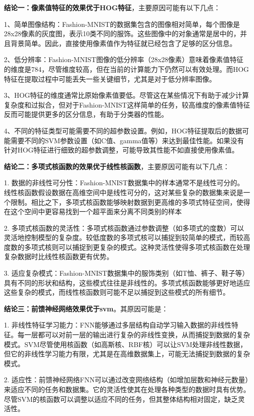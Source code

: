 \documentclass[10.5pt,compsoc,UTF8]{CjC}
\theoremstyle{mystyle}
\begin{document}
\textbf{结论一：像素值特征的效果优于HOG特征}，主要原因可能有以下几点：

1、简单图像结构：Fashion-MNIST的数据集包含的图像相对简单，每个图像是28x28像素的灰度图，表示10类不同的服饰。这些图像中的对象通常是居中的，并且背景简单。因此，直接使用像素值作为特征就已经包含了足够的区分信息。

2、低分辨率：Fashion-MNIST图像的低分辨率（28x28像素）意味着像素值特征的维度是784，尽管维度较高，但在当前的计算能力下仍然可以有效处理。而HOG特征在提取过程中可能丢失一些关键细节，尤其是对于低分辨率图像。

3、HOG特征的维度通常比原始像素值要低。尽管这在某些情况下有助于减少计算复杂度和过拟合，但对于Fashion-MNIST这样简单的任务，较高维度的像素值特征反而可能提供更多的区分信息，有助于分类器的性能。

4、不同的特征类型可能需要不同的超参数设置。例如，HOG特征提取后的数据可能需要不同的SVM参数设置（如C值、gamma值等）来达到最佳性能。如果没有针对HOG特征进行细致的超参数调整，可能导致其性能不如直接使用像素值。

\textbf{结论二：多项式核函数的效果优于线性核函数}，主要原因可能有以下几点：

1. 数据的非线性可分性：Fashion-MNIST数据集中的样本通常不是线性可分的。线性核函数假设数据在高维空间中是线性可分的，这对某些复杂的数据集来说是一个限制。相比之下，多项式核函数能够映射数据到更高维的多项式特征空间，使得在这个空间中更容易找到一个超平面来分离不同类别的样本

2. 多项式核函数的灵活性：多项式核函数通过参数调整（如多项式的度数）可以灵活地控制模型的复杂度。较低度数的多项式核可以捕捉到较简单的模式，而较高度数的多项式核则可以捕捉到更复杂的模式。这种灵活性使得多项式核函数在处理复杂数据时比线性核函数更有优势。

3. 适应复杂模式：Fashion-MNIST数据集中的服饰类别（如T恤、裤子、鞋子等）具有不同的形状和结构，这些模式往往是非线性的。多项式核函数能够更好地适应这些复杂的模式，而线性核函数则可能不足以捕捉到这些模式的所有细节。

\textbf{结论三：前馈神经网络效果优于svm}。其原因可能是：

1. 非线性特征学习能力：FNN能够通过多层结构自动学习输入数据的非线性特征。每一层都可以对前一层的输出进行复杂的非线性变换，从而捕捉到数据的复杂模式。SVM尽管使用核函数（如高斯核、RBF核）可以让SVM处理非线性数据，但它的非线性学习能力有限，尤其是在高维数据集上，可能无法捕捉到数据的复杂模式。

2. 适应性：前馈神经网络FNN可以通过改变网络结构（如增加层数和神经元数量）来适应不同的任务和数据集。它的灵活性使其在处理各种类型的数据时具有优势。尽管SVM的核函数可以调整以适应不同的任务，但其整体结构相对固定，缺乏灵活性。
\end{document}

